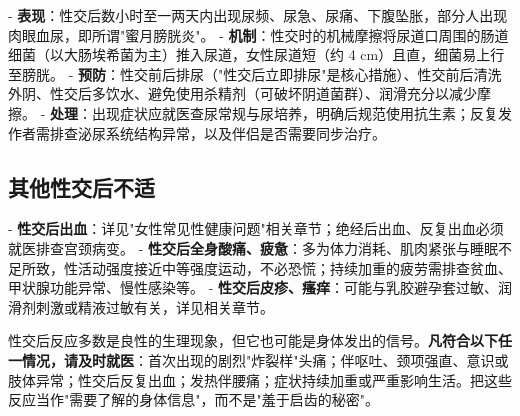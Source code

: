 - \textbf{表现}：性交后数小时至一两天内出现尿频、尿急、尿痛、下腹坠胀，部分人出现肉眼血尿，即所谓"蜜月膀胱炎"。
- \textbf{机制}：性交时的机械摩擦将尿道口周围的肠道细菌（以大肠埃希菌为主）推入尿道，女性尿道短（约 4 cm）且直，细菌易上行至膀胱。
- \textbf{预防}：性交前后排尿（"性交后立即排尿"是核心措施）、性交前后清洗外阴、性交后多饮水、避免使用杀精剂（可破坏阴道菌群）、润滑充分以减少摩擦。
- \textbf{处理}：出现症状应就医查尿常规与尿培养，明确后规范使用抗生素；反复发作者需排查泌尿系统结构异常，以及伴侣是否需要同步治疗。

\subsection{其他性交后不适}

- \textbf{性交后出血}：详见"女性常见性健康问题"相关章节；绝经后出血、反复出血必须就医排查宫颈病变。
- \textbf{性交后全身酸痛、疲惫}：多为体力消耗、肌肉紧张与睡眠不足所致，性活动强度接近中等强度运动，不必恐慌；持续加重的疲劳需排查贫血、甲状腺功能异常、慢性感染等。
- \textbf{性交后皮疹、瘙痒}：可能与乳胶避孕套过敏、润滑剂刺激或精液过敏有关，详见相关章节。

\begin{tcolorbox}[colback=pink!5!white,colframe=red!50!black,title=贴心小叮咛]
性交后反应多数是良性的生理现象，但它也可能是身体发出的信号。\textbf{凡符合以下任一情况，请及时就医}：首次出现的剧烈"炸裂样"头痛；伴呕吐、颈项强直、意识或肢体异常；性交后反复出血；发热伴腰痛；症状持续加重或严重影响生活。把这些反应当作"需要了解的身体信息"，而不是"羞于启齿的秘密"。
\end{tcolorbox}
